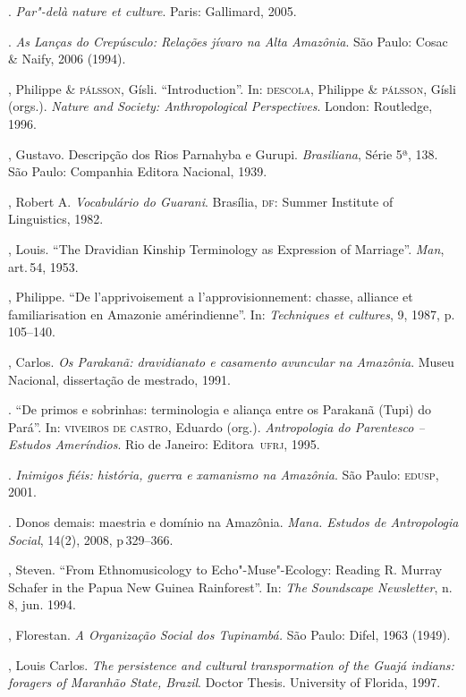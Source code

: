 \begin{bibliohedra}
\titidem. \emph{Par"-delà nature et culture}. Paris: Gallimard, 2005.

\titidem. \emph{As Lanças do Crepúsculo: Relações jívaro na
Alta Amazônia}. São Paulo: Cosac \& Naify, 2006 (1994).

, Philippe \& \textsc{pálsson}, Gísli. ``Introduction''. In: \textsc{descola}, Philippe \& \textsc{pálsson}, Gísli (orgs.). \emph{Nature and Society: Anthropological Perspectives}. London: Routledge, 1996.

, Gustavo. Descripção dos Rios Parnahyba e Gurupi.
\emph{Brasiliana}, Série 5ª, 138. São Paulo: Companhia Editora Nacional, 1939.

, Robert A. \emph{Vocabulário do Guarani}. Brasília, \textsc{df}: Summer
Institute of Linguistics, 1982.

, Louis. ``The Dravidian Kinship Terminology as Expression of
Marriage''. \emph{Man}, art.\,54, 1953.

, Philippe. ``De l'apprivoisement a l'approvisionnement: chasse,
alliance et familiarisation en Amazonie amérindienne''. In:
\emph{Techniques et cultures}, 9, 1987, p.\,105--140.

, Carlos. \emph{Os Parakanã: dravidianato e casamento avuncular na
Amazônia}. Museu Nacional, dissertação de mestrado, 1991.

\titidem. ``De primos e sobrinhas: terminologia e aliança entre os
Parakanã (Tupi) do Pará''. In: \textsc{viveiros de castro}, Eduardo (org.). \emph{Antropologia do Parentesco -- Estudos Ameríndios}. Rio de Janeiro: Editora~\textsc{ufrj}, 1995.

\titidem. \emph{Inimigos fiéis: história, guerra e xamanismo na
Amazônia}. São Paulo: \textsc{edusp}, 2001.

\titidem. Donos demais: maestria e domínio na Amazônia. \emph{Mana.
Estudos de Antropologia Social}, 14(2), 2008, p\,329--366.

, Steven. ``From Ethnomusicology to Echo"-Muse"-Ecology: Reading R.
Murray Schafer in the Papua New Guinea Rainforest''. In: \emph{The Soundscape
Newsletter}, n.\,8, jun. 1994.

, Florestan. \emph{A Organização Social dos Tupinambá.} São
Paulo: Difel, 1963 (1949).

, Louis Carlos. \emph{The persistence and cultural transpormation of the
Guajá indians: foragers of Maranhão State, Brazil}. Doctor
Thesis. University of Florida, 1997.


\end{bibliohedra}
